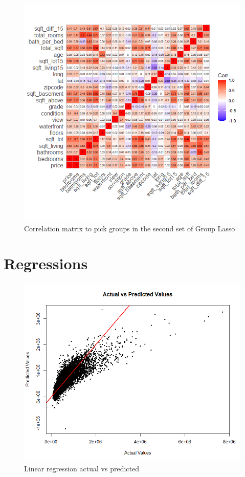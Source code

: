 \documentclass[a4paper, 11pt]{article}
\begin{document}
\begin{figure}[H]
\includegraphics[scale=0.8]{corrmatplot}
\centering
\caption{Correlation matrix to pick groups in the second set of Group Lasso}
\label{fig:corrmatplot}
\end{figure}



\section{Regressions}

\begin{figure}[H]
\includegraphics[scale=0.55]{MLRpred}
\centering
\caption{Linear regression actual vs predicted}
\label{fig:MLRpred}
\end{figure}
\end{document}
